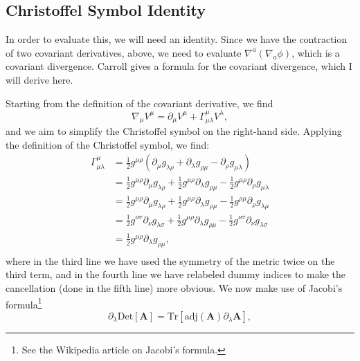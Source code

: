 \documentclass[12pt]{article}
\numberwithin{equation}{section}
\begin{document}
\subsection{Christoffel Symbol Identity}

In order to evaluate this, we will need an identity.  Since we have the contraction of two covariant derivatives, above, we need to evaluate $\nabla^a (\nabla_a \phi)$, which is a covariant divergence.  Carroll gives a formula for the covariant divergence, which I will derive here.

Starting from the definition of the covariant derivative, we find
\begin{equation}
\nabla_\mu V^\mu = \partial_\mu V^\mu + \Gamma^\mu_{\mu \lambda} V^\lambda,
\end{equation}
and we aim to simplify the Christoffel symbol on the right-hand side.  Applying the definition of the Christoffel symbol, we find:
\begin{equation} \label{eq:divergence_christoffel_symbol}
\begin{aligned}
\Gamma^{\mu}_{\mu \lambda} &= \frac{1}{2} g^{\mu \rho} (\partial_\mu g_{\lambda \rho} + \partial_{\lambda} g_{\rho \mu} - \partial_\rho g_{\mu \lambda}) \\
&= \frac{1}{2} g^{\mu \rho} \partial_\mu g_{\lambda \rho} + \frac{1}{2} g^{\mu \rho} \partial_{\lambda} g_{\rho \mu} - \frac{1}{2} g^{\mu \rho} \partial_\rho g_{\mu \lambda} \\
&= \frac{1}{2} g^{\mu \rho} \partial_\mu g_{\lambda \rho} + \frac{1}{2} g^{\mu \rho} \partial_{\lambda} g_{\rho \mu} - \frac{1}{2} g^{\rho \mu} \partial_\rho g_{\lambda \mu} \\
&= \frac{1}{2} g^{\nu \sigma} \partial_\nu g_{\lambda \sigma} + \frac{1}{2} g^{\mu \rho} \partial_{\lambda} g_{\rho \mu} - \frac{1}{2} g^{\nu \sigma} \partial_\nu g_{\lambda \sigma} \\
&= \frac{1}{2} g^{\mu \rho} \partial_{\lambda} g_{\rho \mu}, \\
\end{aligned}
\end{equation}
where in the third line we have used the symmetry of the metric twice on the third term, and in the fourth line we have relabeled dummy indices to make the cancellation (done in the fifth line) more obvious.  We now make use of Jacobi's formula\footnote{See the Wikipedia article on Jacobi's formula.}
\begin{equation} \label{eq:jacobi_formula}
\partial_\lambda \mathrm{Det}[\textbf{A}] = \mathrm{Tr}[\mathrm{adj}(\textbf{A}) \partial_\lambda \textbf{A}],
\end{equation}
\end{document}
